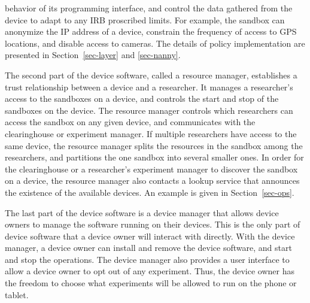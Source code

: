 behavior of its programming interface, and control the 
data gathered from the device to adapt to any IRB proscribed limits. 
For example, the sandbox can anonymize the IP address of a device, constrain  
the frequency of access to GPS locations, and disable
access to cameras. 
The details of policy implementation are presented in 
Section~\ref{sec-layer} and \ref{sec-nanny}.

The second part of the device software, called a resource manager, 
establishes a trust relationship between a device and a researcher. It 
manages a researcher's access to the sandboxes on a device, and
controls the start and stop of the sandboxes on the device. The 
resource manager controls which researchers can access the 
sandbox on any given device, and communicates with the clearinghouse
or experiment manager. If multiple researchers have access to 
the same device, the resource manager splits the resources in the 
sandbox among the researchers, and partitions the one sandbox 
into several smaller ones. In order for the clearinghouse or a 
researcher's experiment manager to discover the sandbox on a 
device, the resource manager also contacts a lookup service that 
announces the existence of the available devices. An example is 
given in Section~\ref{sec-ops}.

The last part of the device software is a device manager that 
allows device owners to manage the software running on their 
devices. This is the only part of device software that a device owner 
will interact with directly. With the device manager, a device owner  
can install and remove the device software, and start and stop the 
operations. The device manager also provides a user interface to 
allow a device owner to opt out of any experiment. Thus, the device 
owner has the freedom to choose what experiments will be allowed 
to run on the phone or tablet.


